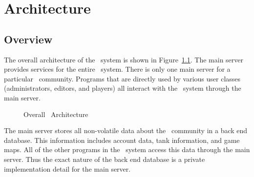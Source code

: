%

\chapter{Architecture}
\label{architecture}

\section{Overview}

The overall architecture of the \VTank\ system is shown in Figure~\ref{fig:arch-VTank}. The main server provides services for the entire \VTank\ system. There is only one main server for a particular \VTank\ community. Programs that are directly used by various user classes (administrators, editors, and players) all interact with the \VTank\ system through the main server.

\begin{figure}[htbp]
  \centering
  \caption{Overall \VTank\ Architecture}
  \label{fig:arch-VTank}
\end{figure}

The main server stores all non-volatile data about the \VTank\ community in a back end database. This information includes account data, tank information, and game maps. All of the other programs in the \VTank\ system access this data through the main server. Thus the exact nature of the back end database is a private implementation detail for the main server.

